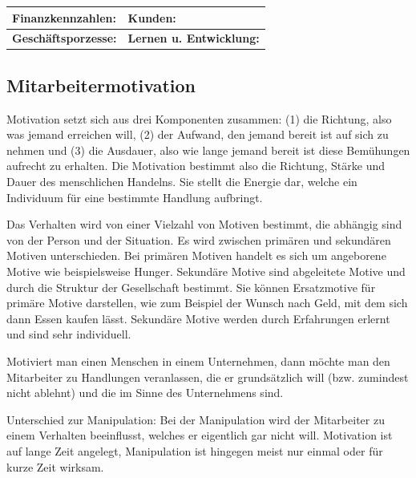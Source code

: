 \begin{tabular}{|p{6cm}|p{6cm}|}
	\hline
	{\bf Finanzkennzahlen:}\vspace{3cm} & {\bf Kunden:}\vspace{3cm} \\
	\hline
	{\bf Geschäftsporzesse:}\vspace{3cm} & {\bf Lernen u. Entwicklung:}\vspace{3cm}\\
	\hline
\end{tabular}


\subsection{Mitarbeitermotivation}
Motivation setzt sich aus drei Komponenten zusammen: (1) die Richtung, also was jemand erreichen will, (2) der Aufwand, den jemand bereit ist auf sich zu nehmen und (3) die Ausdauer, also wie lange jemand bereit ist diese Bemühungen aufrecht zu erhalten. Die Motivation bestimmt also die Richtung, Stärke und Dauer des menschlichen Handelns. Sie stellt die Energie dar, welche ein Individuum für eine bestimmte Handlung aufbringt.

Das Verhalten wird von einer Vielzahl von Motiven bestimmt, die abhängig sind von der Person und der Situation. Es wird zwischen primären und sekundären Motiven unterschieden. Bei primären Motiven handelt es sich um angeborene Motive wie beispielsweise Hunger. Sekundäre Motive sind abgeleitete Motive und durch die Struktur der Gesellschaft bestimmt. Sie können Ersatzmotive für primäre Motive darstellen, wie zum Beispiel der Wunsch nach Geld, mit dem sich dann Essen kaufen lässt. Sekundäre Motive werden durch Erfahrungen erlernt und sind sehr individuell.

Motiviert man einen Menschen in einem Unternehmen, dann möchte man den Mitarbeiter zu Handlungen veranlassen, die er grundsätzlich will (bzw. zumindest nicht ablehnt) und die im Sinne des Unternehmens sind.

Unterschied zur Manipulation: Bei der Manipulation wird der Mitarbeiter zu einem Verhalten beeinflusst, welches er eigentlich gar nicht will.
Motivation ist auf lange Zeit angelegt, Manipulation ist hingegen meist nur einmal oder für kurze Zeit wirksam.

